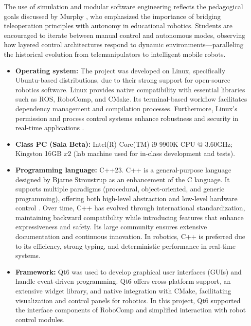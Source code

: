 \documentclass[conference]{IEEEtran}
\begin{document}
The use of simulation and modular software engineering reflects the pedagogical goals discussed by Murphy \cite{murphy2000introduction}, who emphasized the importance of bridging teleoperation principles with autonomy in educational robotics. Students are encouraged to iterate between manual control and autonomous modes, observing how layered control architectures respond to dynamic environments—paralleling the historical evolution from telemanipulators to intelligent mobile robots.


\begin{itemize}
    \item \textbf{Operating system:} The project was developed on Linux, specifically Ubuntu-based distributions, due to their strong support for open-source robotics software. Linux provides native compatibility with essential libraries such as ROS, RoboComp, and CMake. Its terminal-based workflow facilitates dependency management and compilation processes. Furthermore, Linux’s permission and process control systems enhance robustness and security in real-time applications \cite{quigley2009ros}.
    
    \item \textbf{Class PC (Sala Beta):} Intel(R) Core(TM) i9-9900K CPU @ 3.60GHz; Kingston 16GB \(x2\) (lab machine used for in-class development and tests).

    \item \textbf{Programming language:} C++23. C++ is a general-purpose language designed by Bjarne Stroustrup as an enhancement of the C language. It supports multiple paradigms (procedural, object-oriented, and generic programming), offering both high-level abstraction and low-level hardware control \cite{stroustrup2013cpp}. Over time, C++ has evolved through international standardization, maintaining backward compatibility while introducing features that enhance expressiveness and safety. Its large community ensures extensive documentation and continuous innovation. In robotics, C++ is preferred due to its efficiency, strong typing, and deterministic performance in real-time systems.

    \item \textbf{Framework:} Qt6 was used to develop graphical user interfaces (GUIs) and handle event-driven programming. Qt6 offers cross-platform support, an extensive widget library, and native integration with CMake, facilitating visualization and control panels for robotics. In this project, Qt6 supported the interface components of RoboComp and simplified interaction with robot control modules.


\end{itemize}
\end{document}
